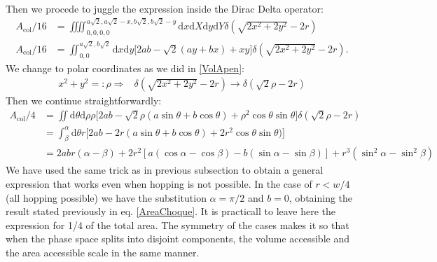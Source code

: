 \documentclass[letterpaper,10pt, jcp, aps]{revtex4-1}
\newcommand{\rd}{\!\mathrm{d}}
\begin{document}
  Then we procede to juggle the expression inside the Dirac Delta operator:
  \begin{align}
    A_\text{col}/16 & =\iiiint _{0,0,0,0}^{a\sqrt{2},a\sqrt{2}-x,b\sqrt{2},b\sqrt{2}-y}
    \rd x \rd X \rd y \rd Y
    \delta (\sqrt{2x^2+2y^2}-2r)\\
    A_\text{col}/16 & =\iint _{0,0}^{a\sqrt{2},b\sqrt{2}}
    \rd x \rd y 
   \bigl[ 2ab-\sqrt{2}(ay+bx)+xy \bigr]
    \delta (\sqrt{2x^2+2y^2}-2r).
    \end{align}
  We change to polar coordinates as we did in \ref{VolApen}:
  \begin{align}
    x^2+y^2 =: \rho   \Rightarrow &  \delta(\sqrt{2x^2+2y^2}-2r) \rightarrow
    \delta(\sqrt{2}\rho-2r)   
    \end{align}
  Then we continue straightforwardly:
    \begin{align}
    A_\text{col}/4 & =\iint 
    \rd \theta \rd \rho \rho
    \bigl[2ab-\sqrt{2}\rho(a\sin\theta+b\cos\theta)+\rho^2\cos\theta\sin\theta
      \bigr]
    \delta(\sqrt{2}\rho-2r) \\
    &=\int_\beta^\alpha \rd \theta r
    \bigl[
      2ab-2r(a\sin\theta+b\cos\theta)+2r^2\cos\theta\sin\theta)
      \bigr] \\
    & = 2abr(\alpha-\beta) + 2r^2 [a (\cos \alpha-\cos\beta) -b (\sin\alpha -\sin\beta)]
    +r^3(\sin^2 \alpha -\sin^2\beta)
    \end{align}
    We have used the same trick as in previous subsection to obtain a general expression
    that works even when hopping is not possible. In the case of $r<w/4$ (all hopping possible)
    we have the substitution $\alpha=\pi/2$ and $b=0$, obtaining the result stated previously
    in eq. \ref{AreaChoque}. It is practicall to leave here the expression for 1/4 of the
    total area. The symmetry of the cases makes it so that when the phase space splits
    into disjoint components, the volume accessible and the area accessible scale in
    the same manner.
    
\end{document}
